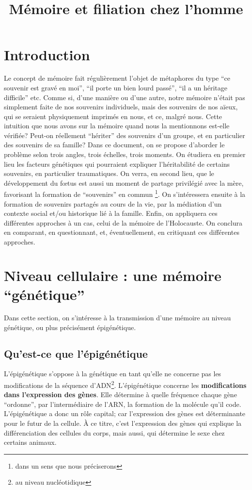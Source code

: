 \documentclass[french]{article}
\title{Mémoire et filiation chez l'homme}
\begin{document}
	
	\maketitle
	\tableofcontents
	\section*{Introduction}
		Le concept de mémoire fait régulièrement l'objet de métaphores du type ``ce souvenir est gravé en moi'', ``il porte un bien lourd passé'', ``il a un héritage difficile'' etc. Comme si, d'une manière ou d'une autre, notre mémoire n'était pas simplement faite de nos souvenirs individuels, mais des souvenirs de nos aïeux, qui se seraient physiquement imprimés en nous, et ce, malgré nous. Cette intuition que nous avons sur la mémoire quand nous la mentionnons est-elle vérifiée? Peut-on réellement ``hériter'' des souvenirs d'un groupe, et en particulier des souvenirs de sa famille? Dans ce document, on se propose d'aborder le problème selon trois angles, trois échelles, trois moments. On étudiera en premier lieu les facteurs génétiques qui pourraient expliquer l'héritabilité de certains souvenirs, en particulier traumatiques. On verra, en second lieu, que le développement du fœtus est aussi un moment de partage privilégié avec la mère, favorisant la formation de ``souvenirs'' en commun \footnote{dans un sens que nous préciserons}. On s'intéressera ensuite à la formation de souvenirs partagés au cours de la vie, par la médiation d'un contexte social et/ou historique lié à la famille. Enfin, on appliquera ces différentes approches à un cas, celui de la mémoire de l'Holocauste. On conclura en comparant, en questionnant, et, éventuellement, en critiquant ces différentes approches.
		\section{Niveau cellulaire : une mémoire ``génétique''}\label{genetique}
			Dans cette section, on s'intéresse à la transmission d'une mémoire au niveau génétique, ou plus précisément épigénétique.
			\subsection{Qu'est-ce que l'épigénétique}
				L'épigénétique s'oppose à la génétique en tant qu'elle ne concerne pas les modifications de la séquence d'ADN\footnote{au niveau nucléotidique}. L'épigénétique concerne les \textbf{modifications dans l'expression des gènes}. Elle détermine à quelle fréquence chaque gène ``ordonne'', par l'intermédiaire de l'ARN, la formation de la molécule qu'il code. L'épigénétique a donc un rôle capital; car l'expression des gènes est déterminante pour le futur de la cellule. À ce titre, c'est l'expression des gènes qui explique la différenciation des cellules du corps, mais aussi, qui détermine le sexe chez certains animaux.\\
				
\end{document}
